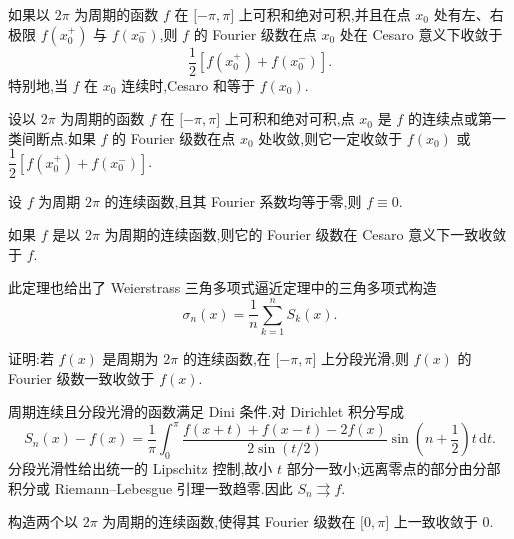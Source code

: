\begin{theorem}[Fejer 定理 $*$]
    如果以 $2\pi$ 为周期的函数 $f$ 在 $\lbrack -\pi,\pi\rbrack$ 上可积和绝对可积,并且在点 $x_0$ 处有左、右极限 $f(x_0^+)$ 与 $f(x_0^-)$,则 $f$ 的 Fourier 级数在点 $x_0$ 处在 Cesaro 意义下收敛于
    \[
        \dfrac{1}{2}[f(x_0^+)+f(x_0^-)].
    \]
    特别地,当 $f$ 在 $x_0$ 连续时,Cesaro 和等于 $f(x_0)$.
\end{theorem}

\begin{theorem}[\markstar]
    设以 $2\pi$ 为周期的函数 $f$ 在 $\lbrack -\pi,\pi\rbrack$ 上可积和绝对可积,点 $x_0$ 是 $f$ 的连续点或第一类间断点.如果 $f$ 的 Fourier 级数在点 $x_0$ 处收敛,则它一定收敛于 $f(x_0)$ 或 $\dfrac{1}{2}[f(x_0^+)+f(x_0^-)]$.
\end{theorem}

\begin{theorem}
    设 $f$ 为周期 $2\pi$ 的连续函数,且其 Fourier 系数均等于零,则 $f\equiv0$.
\end{theorem}

\begin{theorem}[$*$]
    如果 $f$ 是以 $2\pi$ 为周期的连续函数,则它的 Fourier 级数在 Cesaro 意义下一致收敛于 $f$.
\end{theorem}

\begin{remark}
    此定理也给出了 Weierstrass 三角多项式逼近定理中的三角多项式构造
    \[
        \sigma_n(x)=\dfrac{1}{n}\sum\limits_{k=1}^{n}S_k(x).
    \]
\end{remark}

\begin{example}
    证明:若 $f(x)$ 是周期为 $2\pi$ 的连续函数,在 $\lbrack -\pi,\pi\rbrack$ 上分段光滑,则 $f(x)$ 的 Fourier 级数一致收敛于 $f(x)$.
\end{example}
\exampleblank

\begin{solution}
    周期连续且分段光滑的函数满足 Dini 条件.对 Dirichlet 积分写成
    \[
        S_n(x)-f(x)=\dfrac{1}{\pi}\int_0^\pi
        \dfrac{f(x+t)+f(x-t)-2f(x)}{2\sin(t/2)}
        \sin\left(n+\dfrac{1}{2}\right)t\,\mathrm{d}t.
    \]
    分段光滑性给出统一的 Lipschitz 控制,故小 $t$ 部分一致小;远离零点的部分由分部积分或 Riemann--Lebesgue 引理一致趋零.因此 $S_n\rightrightarrows f$.
\end{solution}

\begin{example}
    构造两个以 $2\pi$ 为周期的连续函数,使得其 Fourier 级数在 $\lbrack 0,\pi\rbrack$ 上一致收敛于 $0$.
\end{example}
\exampleblank

